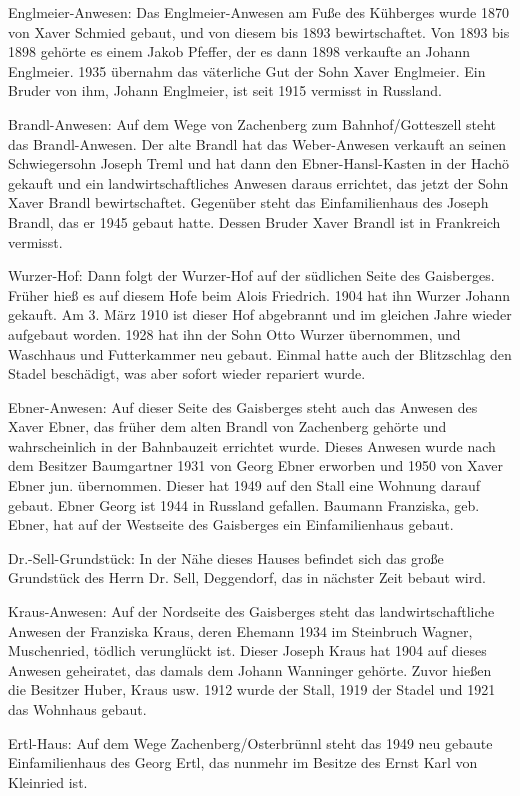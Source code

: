 \documentclass{book}
\begin{document}
Englmeier-Anwesen: Das Englmeier-Anwesen am Fuße des Kühberges wurde 1870 von
Xaver Schmied gebaut, und von diesem bis 1893 bewirtschaftet. Von 1893 bis 1898
gehörte es einem Jakob Pfeffer, der es dann 1898 verkaufte an Johann Englmeier.
1935 übernahm das väterliche Gut der Sohn Xaver Englmeier. Ein Bruder von ihm,
Johann Englmeier, ist seit 1915 vermisst in Russland.

Brandl-Anwesen: Auf dem Wege von Zachenberg zum Bahnhof/Gotteszell steht das
Brandl-Anwesen. Der alte Brandl hat das Weber-Anwesen verkauft an seinen
Schwiegersohn Joseph Treml und hat dann den Ebner-Hansl-Kasten in der Hachö
gekauft und ein landwirtschaftliches Anwesen daraus errichtet, das jetzt der
Sohn Xaver Brandl bewirtschaftet. Gegenüber steht das Einfamilienhaus des Joseph
Brandl, das er 1945 gebaut hatte. Dessen Bruder Xaver Brandl ist in Frankreich
vermisst.

Wurzer-Hof: Dann folgt der Wurzer-Hof auf der südlichen Seite des Gaisberges.
Früher hieß es auf diesem Hofe beim Alois Friedrich. 1904 hat ihn Wurzer Johann
gekauft. Am 3. März 1910 ist dieser Hof abgebrannt und im gleichen Jahre wieder
aufgebaut worden. 1928 hat ihn der Sohn Otto Wurzer übernommen, und Waschhaus
und Futterkammer neu gebaut. Einmal hatte auch der Blitzschlag den Stadel
beschädigt, was aber sofort wieder repariert wurde.

Ebner-Anwesen: Auf dieser Seite des Gaisberges steht auch das Anwesen des Xaver
Ebner, das früher dem alten Brandl von Zachenberg gehörte und wahrscheinlich in
der Bahnbauzeit errichtet wurde. Dieses Anwesen wurde nach dem Besitzer
Baumgartner 1931 von Georg Ebner erworben und 1950 von Xaver Ebner jun.
übernommen. Dieser hat 1949 auf den Stall eine Wohnung darauf gebaut. Ebner
Georg ist 1944 in Russland gefallen. Baumann Franziska, geb. Ebner, hat auf der
Westseite des Gaisberges ein Einfamilienhaus gebaut.

Dr.-Sell-Grundstück: In der Nähe dieses Hauses befindet sich das große
Grundstück des Herrn Dr. Sell, Deggendorf, das in nächster Zeit bebaut wird.

Kraus-Anwesen: Auf der Nordseite des Gaisberges steht das landwirtschaftliche
Anwesen der Franziska Kraus, deren Ehemann 1934 im Steinbruch Wagner,
Muschenried, tödlich verunglückt ist. Dieser Joseph Kraus hat 1904 auf dieses
Anwesen geheiratet, das damals dem Johann Wanninger gehörte. Zuvor hießen die
Besitzer Huber, Kraus usw. 1912 wurde der Stall, 1919 der Stadel und 1921 das
Wohnhaus gebaut.

Ertl-Haus: Auf dem Wege Zachenberg/Osterbrünnl steht das 1949 neu gebaute
Einfamilienhaus des Georg Ertl, das nunmehr im Besitze des Ernst Karl von
Kleinried ist.
\end{document}

